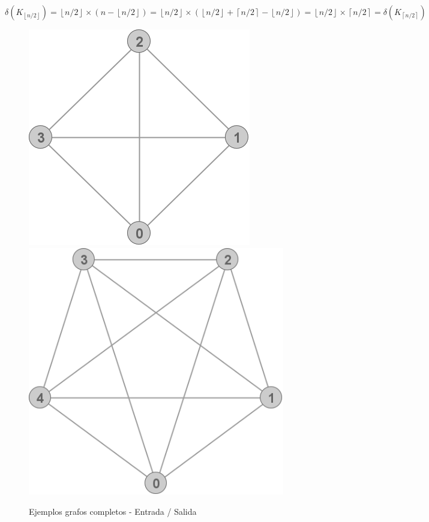	\( 
	\delta(K_{\left \lfloor{n/2}\right \rfloor}) = 
	\left \lfloor{n/2} \right \rfloor \times 
	(n - \left \lfloor{n/2} \right \rfloor ) = 
	\left \lfloor{n/2} \right \rfloor \times 
	(\left \lfloor{n/2} \right \rfloor +
	\left \lceil{n/2} \right \rceil - 
	\left \lfloor{n/2} \right \rfloor) =
	\left \lfloor{n/2} \right \rfloor \times
	\left \lceil{n/2} \right \rceil = 
	\delta(K_{\left \lceil{n/2}\right \rceil})
	\)
\begin{figure}[H]
\caption{Ejemplos grafos completos - Entrada / Salida}
\centering
\includegraphics[scale = 0.5]{img/ej3/constructiva_golosa/K4_st0.png}
\includegraphics[scale = 0.5]{img/ej3/constructiva_golosa/K5_st0.png}

\end{figure}
